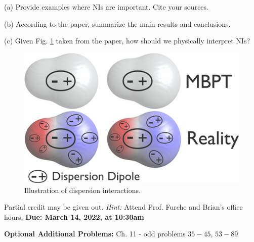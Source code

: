 \documentclass[11pt]{article}
\begin{document}
(a) Provide examples where NIs are important. Cite your sources.

(b) According to the paper, summarize the main results and conclusions.

(c) Given Fig. \ref{fig:nis} taken from the paper, how should we physically interpret NIs?
\begin{figure}[hbpt]
  \centering
  \includegraphics[scale=1.5]{dispersion.jpeg}
  \caption{Illustration of dispersion interactions.}
  \label{fig:nis}
\end{figure}

Partial credit may be given out. \textit{Hint:} Attend Prof. Furche and Brian's office hours.
\textbf{Due: March 14, 2022, at 10:30am}

\vfill
\textbf{Optional Additional Problems:} Ch. 11 - odd problems $35 - 45$, $53 - 89$
\end{document}
